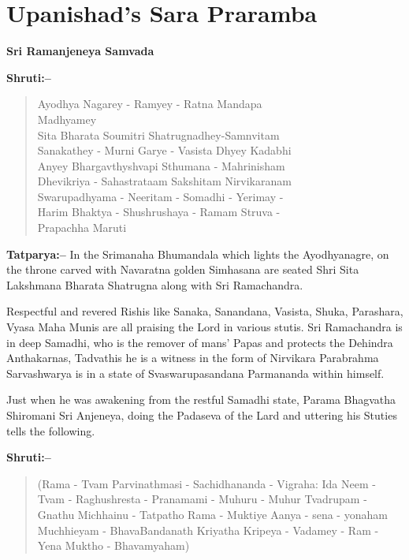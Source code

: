 
\chapter{Upanishad's Sara Praramba}

\begin{center}
\textbf{Sri Ramanjeneya Samvada}
\end{center}

\textbf{Shruti:–}

\begin{verse}
Ayodhya Nagarey - Ramyey - Ratna Mandapa \\ Madhyamey \\ Sita Bharata Soumitri Shatrugnadhey-Samnvitam \\ Sanakathey - Murni Garye - Vasista Dhyey Kadabhi \\ Anyey Bhargavthyshvapi Sthumana - Mahrinisham \\ Dhevikriya - Sahastrataam Sakshitam Nirvikaranam \\ Swarupadhyama - Neeritam - Somadhi - Yerimay -\\ Harim Bhaktya - Shushrushaya - Ramam Struva -\\ Prapachha Maruti 
\end{verse}

\textbf{Tatparya:–} In the Srimanaha Bhumandala which lights the Ayodhya\-nagre, on the throne carved with Navaratna golden Simhasana are seated Shri Sita Lakshmana Bharata Shatrugna along with Sri Ramachandra.

Respectful and revered Rishis like Sanaka, Sanandana, Vasista, Shuka, Parashara, Vyasa Maha Munis are all praising the Lord in various stutis. Sri Ramachandra is in deep Samadhi, who is the remover of mans' Papas and protects the Dehindra Anthakarnas, Tadvathis he is a witness in the form of Nirvikara Parabrahma Sarvashwarya is in a state of Svaswarupasandana Parmananda within himself.

\newpage

Just when he was awakening from the restful Samadhi state, Parama Bhagvatha Shiromani Sri Anjeneya, doing the Padaseva of the Lard and uttering his Stuties tells the following.

\textbf{Shruti:–}

\begin{verse}
(Rama - Tvam Parvinathmasi - Sachidhananda - Vi\break graha:  Ida Neem - Tvam - Raghushresta - Pranamami - Muhuru - Muhur  Tvadrupam -Gnathu Michhainu - Tatpatho Rama - Muktiye  Aanya - sena - yonaham Muchhieyam - BhavaBandanath  Kriyatha Kripeya - Vadamey - Ram - Yena Muktho - Bhavamyaham)
\end{verse}

